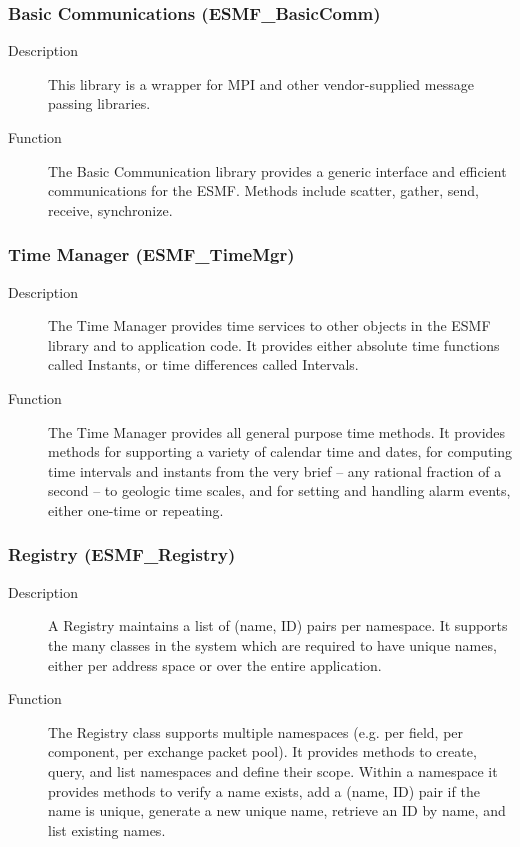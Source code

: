 \subsubsection{Basic Communications (ESMF\_BasicComm)}
\label{sec:basiccomm} 
\begin{description}
\item [Description] This library is a wrapper for MPI and other vendor-supplied 
message passing libraries.
\item [Function] The Basic Communication library provides a generic interface
and efficient communications for the ESMF.  Methods include scatter, gather, send,
receive, synchronize. 
\end{description}

\subsubsection{Time Manager (ESMF\_TimeMgr)}
\label{sec:timemgr} 
\begin{description}
\item [Description] The Time Manager provides time services to other objects
in the ESMF library and to application code.  It provides either absolute
time functions called Instants, or time differences called Intervals.
\item [Function] The Time Manager provides all general purpose time methods. 
It provides methods for supporting a variety of calendar time and dates,
for computing time intervals and instants from the very brief -- any 
rational fraction of a second -- to geologic time scales, and for
setting and handling alarm events, either one-time or repeating.
\end{description}

\subsubsection{Registry (ESMF\_Registry)}
\label{sec:registry} 
\begin{description}
\item [Description] A Registry maintains a list of (name, ID) pairs per 
namespace.  It supports the many classes in the system which are
required to have unique names, either per address space or over the entire
application.  
\item [Function] The Registry class supports multiple namespaces (e.g. per
field, per component, per exchange packet pool).  It provides methods to
create, query, and list namespaces and define their scope.  
Within a namespace it provides methods to
verify a name exists, add a (name, ID) pair if the name is unique,
generate a new unique name, retrieve an ID by name, and list existing names.
\end{description}

